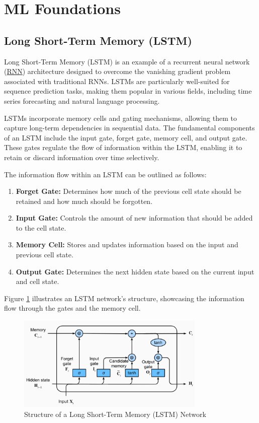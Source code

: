 \documentclass[a4paper,10pt]{article}
\begin{document}
\section{ML Foundations}

\subsection{Long Short-Term Memory (LSTM)}\label{appx:lstm}

Long Short-Term Memory (LSTM) is an example of a recurrent neural network (\hyperref[appx:rnn]{RNN}) architecture designed to overcome the vanishing gradient problem associated with traditional RNNs. LSTMs are particularly well-suited for sequence prediction tasks, making them popular in various fields, including time series forecasting and natural language processing.

LSTMs incorporate memory cells and gating mechanisms, allowing them to capture long-term dependencies in sequential data. The fundamental components of an LSTM include the input gate, forget gate, memory cell, and output gate. These gates regulate the flow of information within the LSTM, enabling it to retain or discard information over time selectively.

The information flow within an LSTM can be outlined as follows:

\begin{enumerate}
  \item \textbf{Forget Gate:} Determines how much of the previous cell state should be retained and how much should be forgotten.

  \item \textbf{Input Gate:} Controls the amount of new information that should be added to the cell state.

  \item \textbf{Memory Cell:} Stores and updates information based on the input and previous cell state.

  \item \textbf{Output Gate:} Determines the next hidden state based on the current input and cell state.

\end{enumerate}

Figure \ref{figure:lstm_structure} illustrates an LSTM network's structure, showcasing the information flow through the gates and the memory cell.

\begin{figure}[ht]
  \centering
  \includegraphics[width=0.8\textwidth]{figure/lstm.png}
  \caption{Structure of a Long Short-Term Memory (LSTM) Network}
  \label{figure:lstm_structure}
\end{figure}
\end{document}
